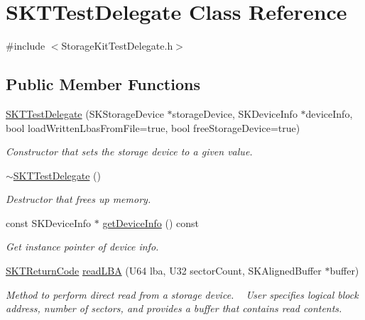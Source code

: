 \hypertarget{class_s_k_t_test_delegate}{}\section{S\+K\+T\+Test\+Delegate Class Reference}
\label{class_s_k_t_test_delegate}


{\ttfamily \#include $<$Storage\+Kit\+Test\+Delegate.\+h$>$}

\subsection*{Public Member Functions}
\begin{DoxyCompactItemize}
\item 
\mbox{\hyperlink{class_s_k_t_test_delegate_aecc4032aaee08b7c6f8eb4b5d21c1816}{S\+K\+T\+Test\+Delegate}} (S\+K\+Storage\+Device $\ast$storage\+Device, S\+K\+Device\+Info $\ast$device\+Info, bool load\+Written\+Lbas\+From\+File=true, bool free\+Storage\+Device=true)
\begin{DoxyCompactList}\small\item\em Constructor that sets the storage device to a given value. \end{DoxyCompactList}\item 
\mbox{\hyperlink{class_s_k_t_test_delegate_a7c0d861c72b763e76b2bde4c2f328989}{$\sim$\+S\+K\+T\+Test\+Delegate}} ()
\begin{DoxyCompactList}\small\item\em Destructor that frees up memory. \end{DoxyCompactList}\item 
const S\+K\+Device\+Info $\ast$ \mbox{\hyperlink{class_s_k_t_test_delegate_a77a53f075777687fa04173bc2efcd5ba}{get\+Device\+Info}} () const
\begin{DoxyCompactList}\small\item\em Get instance pointer of device info. \end{DoxyCompactList}\item 
\mbox{\hyperlink{_storage_kit_test_delegate_8h_a143844aea21c1ac420c1d0307a69deb7}{S\+K\+T\+Return\+Code}} \mbox{\hyperlink{class_s_k_t_test_delegate_a5dc6c0bb31013a0ecf4adf5506fa8524}{read\+L\+BA}} (U64 lba, U32 sector\+Count, S\+K\+Aligned\+Buffer $\ast$buffer)
\begin{DoxyCompactList}\small\item\em Method to perform direct read from a storage device. ~\newline
User specifies logical block address, number of sectors, and provides a buffer that contains read contents. \end{DoxyCompactList}\item 

\end{DoxyCompactItemize}
